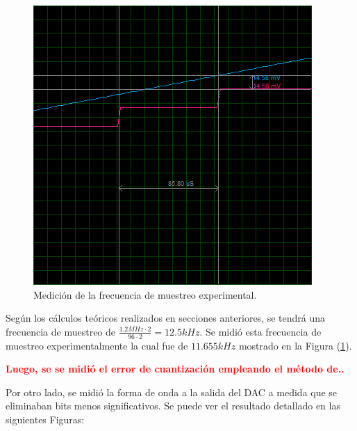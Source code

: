 \begin{figure}[H]
\centering
\includegraphics[width=0.8\linewidth]{ImagenesEjercicio1/rampa1zoom.png}
\caption{Medición de la frecuencia de muestreo experimental.}
\label{med2}
\end{figure}
Según los cálculos teóricos realizados en secciones anteriores, se tendrá una frecuencia de muestreo de $\frac{1.2MHz \cdot 2}{96 \cdot 2} = 12.5kHz$. Se midió esta frecuencia de muestreo experimentalmente la cual fue de $11.655kHz$ mostrado en la Figura (\ref{med2}).


\begin{center}
	\LARGE{\textcolor{red}{\textbf{Luego, se se midió el error de cuantización empleando el método de..}}}
\end{center}

Por otro lado, se midió la forma de onda a la salida del DAC a medida que se eliminaban bits menos significativos. Se puede ver el resultado detallado en las siguientes Figuras:

\newpage

